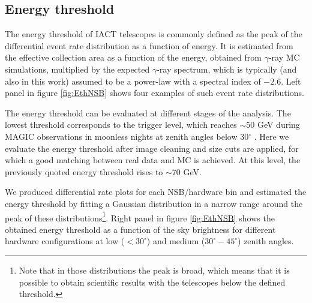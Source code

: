 \documentclass{PoS}
\begin{document}

\subsection*{Energy threshold}

The energy threshold of IACT telescopes is commonly defined as the peak of the differential event rate distribution as a function of energy. It is estimated from the effective collection area as a function of the energy, obtained from $\gamma$-ray MC simulations, multiplied by the expected $\gamma$-ray spectrum, which is typically (and also in this work) assumed to be a power-law with a spectral index of $-2.6$. Left panel in figure \ref{fig:EthNSB} shows four examples of such event rate distributions.

The energy threshold can be evaluated at different stages of the analysis. The lowest threshold corresponds to the trigger level, which reaches $\sim50$ GeV during MAGIC  observations in moonless nights at zenith angles below 30$^\circ$ \cite{upgrade2}.  Here we evaluate the energy threshold after image cleaning and size cuts are applied, for which a good matching between real data and MC is achieved. At this level, the previously quoted energy threshold rises to $\sim70$ GeV.

We produced differential rate plots for each NSB/hardware bin and estimated the energy threshold by fitting a Gaussian distribution in a narrow range around the peak of these distributions\footnote{Note that in those distributions the peak is broad, which means that it is possible to obtain scientific results with the telescopes below the defined threshold.}. Right panel in figure \ref{fig:EthNSB} shows the obtained energy threshold as a function of the sky brightness for different hardware configurations at low ($<30^\circ$) and medium ($30^\circ - 45^\circ$) zenith angles. %


\end{document}
